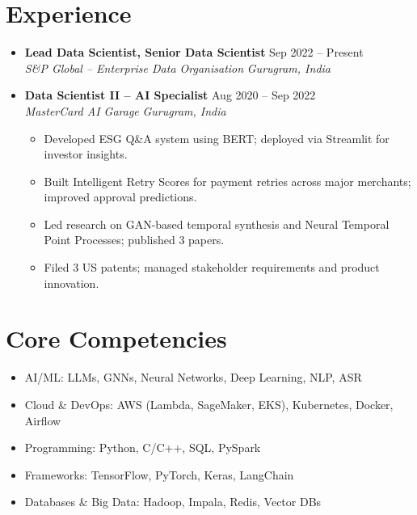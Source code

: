 \documentclass[letterpaper,11pt]{article}
\newcommand{\resumeItem}[1]{\item #1}
\newcommand{\resumeSubheading}[4]{\item \textbf{#1} \hfill #2\\\textit{#3} \hfill \textit{#4}}
\begin{document}
\section{Experience}
\begin{itemize}[leftmargin=*]
  \resumeSubheading{Lead Data Scientist, Senior Data Scientist}{Sep 2022 -- Present}{S&P Global – Enterprise Data Organisation}{Gurugram, India}

  \resumeSubheading{Data Scientist II – AI Specialist}{Aug 2020 -- Sep 2022}{MasterCard AI Garage}{Gurugram, India}
  \begin{itemize}[leftmargin=0.5cm]
    \resumeItem{Developed ESG Q\&A system using BERT; deployed via Streamlit for investor insights.}
    \resumeItem{Built Intelligent Retry Scores for payment retries across major merchants; improved approval predictions.}
    \resumeItem{Led research on GAN-based temporal synthesis and Neural Temporal Point Processes; published 3 papers.}
    \resumeItem{Filed 3 US patents; managed stakeholder requirements and product innovation.}
  \end{itemize}
\end{itemize}

\section{Core Competencies}
\begin{itemize}[leftmargin=*]
  \resumeItem{AI/ML: LLMs, GNNs, Neural Networks, Deep Learning, NLP, ASR}
  \resumeItem{Cloud & DevOps: AWS (Lambda, SageMaker, EKS), Kubernetes, Docker, Airflow}
  \resumeItem{Programming: Python, C/C++, SQL, PySpark}
  \resumeItem{Frameworks: TensorFlow, PyTorch, Keras, LangChain}
  \resumeItem{Databases & Big Data: Hadoop, Impala, Redis, Vector DBs}
\end{itemize}

\end{document}
